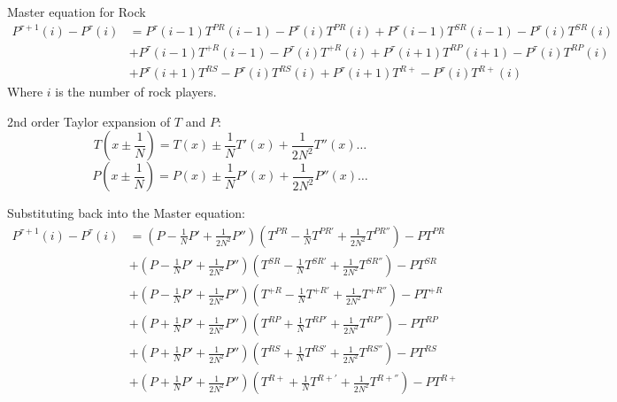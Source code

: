 \documentclass[./main.tex]{subfiles}
\begin{document}
\noindent Master equation for Rock
\begin{equation}
  \begin{aligned}
  P^{\tau + 1}(i) - P^\tau(i) &= P^\tau(i-1)T^{PR}(i-1) - P^\tau(i)T^{PR}(i) + P^\tau(i-1)T^{SR}(i-1) - P^\tau(i)T^{SR}(i) \\
  &+ P^\tau(i-1)T^{+R}(i-1) - P^\tau(i)T^{+R}(i) + P^\tau(i+1)T^{RP}(i+1) - P^\tau(i)T^{RP}(i) \\
  &+ P^\tau(i+1)T^{RS} - P^\tau(i)T^{RS}(i) + P^\tau(i+1)T^{R+} - P^\tau(i)T^{R+}(i)
  \end{aligned}
\end{equation}
Where $i$ is the number of rock players.

2nd order Taylor expansion of $T$ and $P$:
\begin{equation}
  T(x\pm\frac{1}{N}) = T(x) \pm \frac{1}{N}T'(x) + \frac{1}{2N^2}T''(x)\dots \nonumber
\end{equation}
\begin{equation}
  P(x\pm\frac{1}{N}) = P(x) \pm \frac{1}{N}P'(x) + \frac{1}{2N^2}P''(x)\dots \nonumber
\end{equation}


Substituting back into the Master equation:
\begin{equation}
\begin{aligned}
P^{\tau + 1}(i) - P^\tau(i) 
&= (P-\frac{1}{N}P' + \frac{1}{2N^2}P'')(T^{PR} - \frac{1}{N}T^{PR'} + \frac{1}{2N^2}T^{PR''}) - PT^{PR} \\
&+ (P-\frac{1}{N}P' + \frac{1}{2N^2}P'')(T^{SR} - \frac{1}{N}T^{SR'} + \frac{1}{2N^2}T^{SR''}) - PT^{SR} \\
&+ (P-\frac{1}{N}P' + \frac{1}{2N^2}P'')(T^{+R} - \frac{1}{N}T^{+R'} + \frac{1}{2N^2}T^{+R''}) - PT^{+R} \\
&+ (P+\frac{1}{N}P' + \frac{1}{2N^2}P'')(T^{RP} + \frac{1}{N}T^{RP'} + \frac{1}{2N^2}T^{RP''}) - PT^{RP} \\
&+ (P+\frac{1}{N}P' + \frac{1}{2N^2}P'')(T^{RS} + \frac{1}{N}T^{RS'} + \frac{1}{2N^2}T^{RS''}) - PT^{RS} \\
&+ (P+\frac{1}{N}P' + \frac{1}{2N^2}P'')(T^{R+} + \frac{1}{N}T^{R+'} + \frac{1}{2N^2}T^{R+''}) - PT^{R+}
\end{aligned}
\end{equation}
\end{document}
